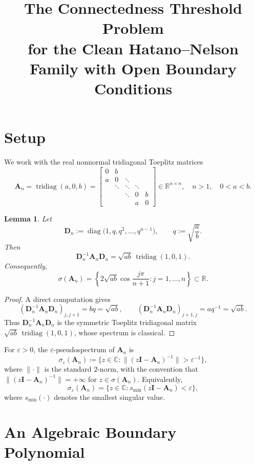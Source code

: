 \documentclass[11pt]{article}
\title{The Connectedness Threshold Problem\\
for the Clean Hatano--Nelson Family with Open Boundary Conditions}
\author{}
\date{}
\newtheorem{lemma}[theorem]{Lemma}
\begin{document}
\maketitle

\section{Setup}

We work with the real nonnormal tridiagonal Toeplitz matrices
\[
\mathbf{A}_n=\operatorname{tridiag}(a,0,b)
=\begin{bmatrix}
0 & b \\
a & 0 & \ddots \\
& \ddots & \ddots & \ddots \\
&& \ddots & 0 & b \\
&&& a & 0
\end{bmatrix}
\in\mathbb{R}^{n\times n},
\quad n>1, \quad 0<a<b.
\]

\begin{lemma}\label{lem:real-spectrum}
Let
\[
\mathbf{D}_n:=\operatorname{diag}\bigl(1,q,q^2,\dots,q^{n-1}\bigr),
\qquad q:=\sqrt{\frac{a}{b}}.
\]
Then
\[
\mathbf{D}_n^{-1}\mathbf{A}_n\mathbf{D}_n
=\sqrt{ab}\,\operatorname{tridiag}(1,0,1).
\]
Consequently,
\[
\sigma(\mathbf{A}_n)
=\left\{2\sqrt{ab}\cos\frac{j\pi}{n+1}:j=1,\dots,n\right\}
\subset \mathbb{R}.
\]
\end{lemma}

\begin{proof}
A direct computation gives
\[
(\mathbf{D}_n^{-1}\mathbf{A}_n\mathbf{D}_n)_{j,j+1}=bq=\sqrt{ab},
\qquad
(\mathbf{D}_n^{-1}\mathbf{A}_n\mathbf{D}_n)_{j+1,j}=aq^{-1}=\sqrt{ab}.
\]
Thus \(\mathbf{D}_n^{-1}\mathbf{A}_n\mathbf{D}_n\) is the symmetric Toeplitz tridiagonal matrix
\(\sqrt{ab}\,\operatorname{tridiag}(1,0,1)\), whose spectrum is classical.
\end{proof}

For \(\varepsilon>0\), the \(\varepsilon\)-pseudospectrum of \(\mathbf{A}_n\) is
\[
\sigma_\varepsilon(\mathbf{A}_n)\coloneqq\{z\in\mathbb{C}:\|(z\mathbf{I}-\mathbf{A}_n)^{-1}\|>\varepsilon^{-1}\},
\]
where \(\|\cdot\|\) is the standard \(2\)-norm, with the convention that
\(\|(z\mathbf{I}-\mathbf{A}_n)^{-1}\|=+\infty\) for \(z\in\sigma(\mathbf{A}_n)\).
Equivalently,
\[
\sigma_\varepsilon(\mathbf{A}_n)
=\{z\in\mathbb{C}:s_{\min}(z\mathbf{I}-\mathbf{A}_n)<\varepsilon\},
\]
where \(s_{\min}(\cdot)\) denotes the smallest singular value.

\section{An Algebraic Boundary Polynomial}
\end{document}
